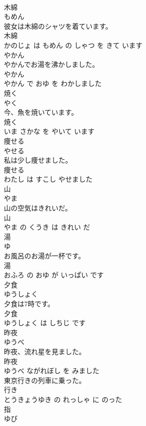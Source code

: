 \documentclass[8pt]{extreport}
\begin{document}
\begin{CJK}{UTF8}{min}
\\	木綿	
\\	もめん			
\\	彼女は木綿のシャツを着ています。	
\\	木綿 
\\	かのじょ は もめん の しゃつ を きて います			
\\	やかん	
\\	やかんでお湯を沸かしました。	
\\	やかん 
\\	やかん で おゆ を わかしました			
\\	焼く	
\\	やく			
\\	今、魚を焼いています。	
\\	焼く 
\\	いま さかな を やいて います			
\\	痩せる	
\\	やせる			
\\	私は少し痩せました。	
\\	痩せる 
\\	わたし は すこし やせました			
\\	山	
\\	やま			
\\	山の空気はきれいだ。	
\\	山 
\\	やま の くうき は きれい だ			
\\	湯	
\\	ゆ			
\\	お風呂のお湯が一杯です。	
\\	湯 
\\	おふろ の おゆ が いっぱい です			
\\	夕食	
\\	ゆうしょく			
\\	夕食は7時です。	
\\	夕食 
\\	ゆうしょく は しちじ です			
\\	昨夜	
\\	ゆうべ			
\\	昨夜、流れ星を見ました。	
\\	昨夜 
\\	ゆうべ ながれぼし を みました			
\\	東京行きの列車に乗った。	
\\	行き 
\\	とうきょうゆき の れっしゃ に のった			
\\	指	
\\	ゆび			

\end{CJK}
\end{document}
